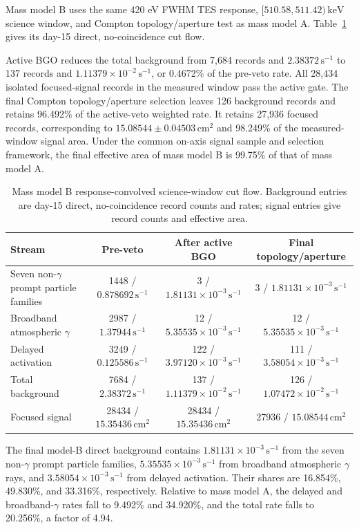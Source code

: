 \documentclass[11pt]{article}
\newcommand{\revblue}[1]{\textcolor{revisionblue}{#1}}
\newcommand{\keV}{\ensuremath{\,\mathrm{keV}}}
\newcommand{\cps}{\ensuremath{\,\mathrm{s^{-1}}}}
\begin{document}
Mass model B uses the same 420 eV FWHM TES response, $[510.58,511.42)\keV$ science window, and Compton topology/aperture test as mass model A. Table~\ref{tab:optimized_cutflow} gives its day-15 direct, no-coincidence cut flow.

Active BGO reduces the total background from 7,684 records and $2.38372\cps$ to 137 records and $1.11379\times10^{-2}\cps$, or 0.4672\% of the pre-veto rate. All 28,434 isolated focused-signal records in the measured window pass the active gate. The final Compton topology/aperture selection leaves 126 background records and retains 96.492\% of the active-veto weighted rate. It retains 27,936 focused records, corresponding to $15.08544\pm0.04503\,\mathrm{cm^2}$ and 98.249\% of the measured-window signal area. \revblue{Under the common on-axis signal sample and selection framework, the final effective area of mass model B is 99.75\% of that of mass model A.}

\begin{table}[H]
\centering
\caption{Mass model B response-convolved science-window cut flow. Background entries are day-15 direct, no-coincidence record counts and rates; signal entries give record counts and effective area.}
\label{tab:optimized_cutflow}
\footnotesize
\begin{tabular}{lccc}
\toprule
Stream & Pre-veto & After active BGO & Final topology/aperture \\
\midrule
\revblue{Seven non-$\gamma$ prompt particle families} & 1448 / $0.878692\cps$ & 3 / $1.81131\times10^{-3}\cps$ & 3 / $1.81131\times10^{-3}\cps$ \\
Broadband atmospheric $\gamma$ & 2987 / $1.37944\cps$ & 12 / $5.35535\times10^{-3}\cps$ & 12 / $5.35535\times10^{-3}\cps$ \\
Delayed activation & 3249 / $0.125586\cps$ & 122 / $3.97120\times10^{-3}\cps$ & 111 / $3.58054\times10^{-3}\cps$ \\
Total background & 7684 / $2.38372\cps$ & 137 / $1.11379\times10^{-2}\cps$ & 126 / $1.07472\times10^{-2}\cps$ \\
Focused signal & 28434 / $15.35436\,\mathrm{cm^2}$ & 28434 / $15.35436\,\mathrm{cm^2}$ & 27936 / $15.08544\,\mathrm{cm^2}$ \\
\bottomrule
\end{tabular}
\end{table}

The final model-B direct background contains $1.81131\times10^{-3}\cps$ from
the \revblue{seven non-$\gamma$ prompt particle families}, $5.35535\times10^{-3}\cps$ from broadband
atmospheric $\gamma$ rays, and $3.58054\times10^{-3}\cps$ from delayed
activation. Their shares are 16.854\%, 49.830\%, and 33.316\%, respectively.
Relative to mass model A, the delayed and broadband-$\gamma$ rates fall to
9.492\% and 34.920\%, and the total rate falls to 20.256\%, a factor of 4.94.
\end{document}
